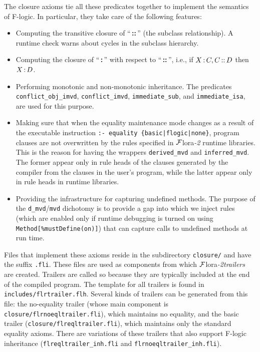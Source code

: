 \documentclass[11pt]{article}
\newcommand{\isa}{\,{\bf{:}}\,}
\newcommand{\subcl}{\,{\bf{::}}\,}
\newcommand{\FLORA}{{\mbox{\sc ${\cal F}${lora}\rm\emph{-2}}}\xspace}
\newcommand{\fl}{\mbox{F-logic}\xspace}
\begin{document}
The closure axioms tie all these predicates together to implement the
semantics of \fl. In particular, they take care of the following features:
\begin{itemize}
\item Computing the transitive closure of ``\subcl'' (the subclass
  relationship).  A runtime check warns about cycles in the subclass
  hierarchy.
\item Computing the closure of ``\isa'' with respect to ``\subcl'', i.e.,
  if $X\isa C, C\subcl D$ then $X\isa D$.
\item Performing monotonic and non-monotonic inheritance. The predicates
  {\tt conflict\_obj\_imvd}, {\tt conflict\_imvd}, {\tt immediate\_sub},
  and {\tt immediate\_isa}, are used for this purpose.
\item Making sure that when the equality maintenance mode changes as a
  result of the executable instruction {\tt :- equality
  \{basic|flogic|none\}}, program clauses are not overwritten by the
  rules specified in \FLORA runtime libraries. This is the reason for
  having the wrappers {\tt derived\_mvd} and {\tt inferred\_mvd}. The former
  appear only in rule heads of the clauses generated by the compiler
  from the clauses in the user's program, while the latter appear only in
  rule heads in runtime libraries.
\item Providing the infrastructure for capturing undefined methods.
  The purpose of the {\tt d\_mvd}/{\tt mvd} dichotomy is to provide a gap
  into which we inject rules
  (which are enabled only if runtime debugging is turned on using
  {\tt Method[\%mustDefine(on)]}) that can capture calls to undefined
  methods at run time.
\end{itemize}
Files that implement these axioms reside in the subdirectory
\texttt{closure/} and have the suffix {\tt .fli}.  These files are used as
components from which \FLORA \emph{trailers} are created.  Trailers are
called so because they are typically included at the end of the compiled
program. The template for all trailers is found in
{\tt includes/flrtrailer.flh}.  Several kinds of trailers can be generated from
this file: the no-equality trailer (whose main component is {\tt
  closure/flrnoeqltrailer.fli}), which maintains no equality, and the basic
trailer ({\tt closure/flreqltrailer.fli}), which maintains only the
standard equality axioms.
There are variations of these trailers that also support \fl inheritance
({\tt flreqltrailer\_inh.fli}  and {\tt flrnoeqltrailer\_inh.fli}).
\end{document}
